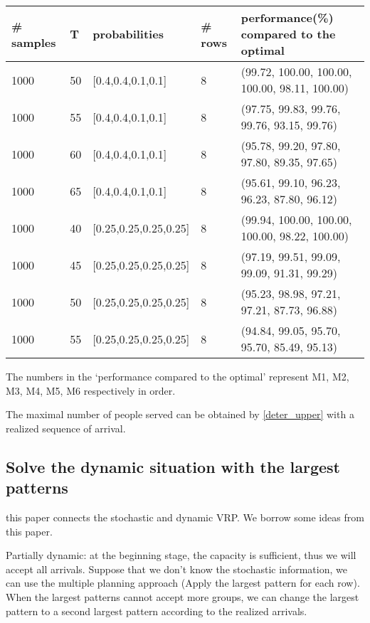 \begin{table}[ht]
  \begin{tabular}{|l|l|l|l|l|}
  \hline
  \# samples & T & probabilities & \# rows & performance(\%) compared to the optimal \\
  \hline
  1000  & 50  & [0.4,0.4,0.1,0.1] & 8 & (99.72, 100.00, 100.00, 100.00, 98.11, 100.00) \\
  1000  & 55  & [0.4,0.4,0.1,0.1] & 8 & (97.75, 99.83, 99.76, 99.76, 93.15, 99.76) \\ %
  1000  & 60  & [0.4,0.4,0.1,0.1] & 8 & (95.78, 99.20, 97.80, 97.80, 89.35, 97.65) \\
  1000  & 65  & [0.4,0.4,0.1,0.1] & 8 & (95.61, 99.10, 96.23, 96.23, 87.80, 96.12) \\
  \hline
  1000  & 40  & [0.25,0.25,0.25,0.25] & 8 & (99.94, 100.00, 100.00, 100.00, 98.22, 100.00) \\
  1000  & 45  & [0.25,0.25,0.25,0.25] & 8 & (97.19, 99.51, 99.09, 99.09, 91.31, 99.29) \\
  1000  & 50  & [0.25,0.25,0.25,0.25] & 8 & (95.23, 98.98, 97.21, 97.21, 87.73, 96.88) \\
  1000  & 55  & [0.25,0.25,0.25,0.25] & 8 & (94.84, 99.05, 95.70, 95.70, 85.49, 95.13) \\
  \hline
  \end{tabular}
\end{table}
 
The numbers in the `performance compared to the optimal' represent M1, M2, M3, M4, M5, M6 respectively in order.

The maximal number of people served can be obtained by \eqref{deter_upper} with a realized sequence of arrival.

\subsection{Solve the dynamic situation with the largest patterns}\label{largest_pattern}

\cite{bent2004scenario} this paper connects the stochastic and dynamic VRP. We borrow some ideas from this paper.

Partially dynamic: at the beginning stage, the capacity is sufficient, thus we will accept all arrivals. Suppose that we don't know the stochastic information, we can use the multiple planning approach (Apply the largest pattern for each row). 
When the largest patterns cannot accept more groups, we can change the 
largest pattern to a second largest pattern according to the realized arrivals.

